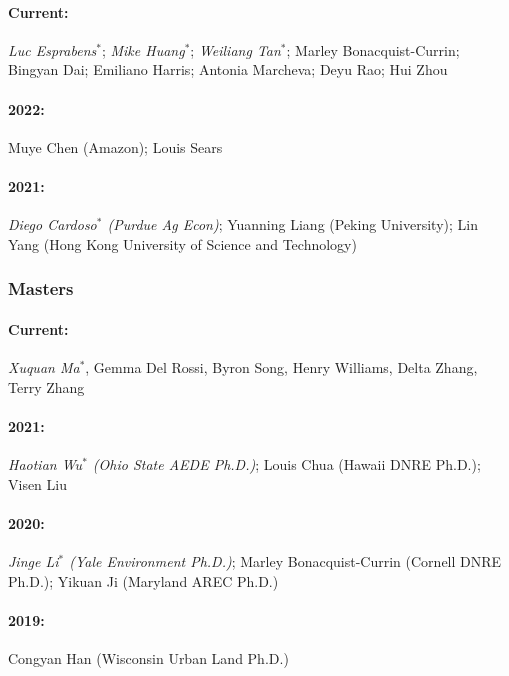 \documentclass[12pt]{res} %
\begin{document}
\begin{resume}
\paragraph{Current:} \textit{Luc Esprabens}$^*$; \textit{Mike Huang}$^*$; \textit{Weiliang Tan}$^*$; Marley Bonacquist-Currin; Bingyan Dai; Emiliano Harris; Antonia Marcheva; Deyu Rao; Hui Zhou
\vspace{-.4in}
\paragraph{2022:} Muye Chen (Amazon); Louis Sears
\vspace{-.4in}
\paragraph{2021:} \textit{Diego Cardoso$^*$ (Purdue Ag Econ)}; Yuanning Liang (Peking University); Lin Yang (Hong Kong University of Science and Technology)

\vspace{-.2in}

\subsubsection{Masters}\vspace{-.2in}
\paragraph{Current:} \textit{Xuquan Ma$^*$}, Gemma Del Rossi, Byron Song, Henry Williams, Delta Zhang, Terry Zhang
\vspace{-.4in}
\paragraph{2021:} \textit{Haotian Wu$^*$ (Ohio State AEDE Ph.D.)}; Louis Chua (Hawaii DNRE Ph.D.); Visen Liu
\vspace{-.4in}
\paragraph{2020:} \textit{Jinge Li$^*$ (Yale Environment Ph.D.)}; Marley Bonacquist-Currin (Cornell DNRE Ph.D.); Yikuan Ji (Maryland AREC Ph.D.)
\vspace{-.4in}
\paragraph{2019:} Congyan Han (Wisconsin Urban Land Ph.D.)


\end{resume}
\end{document}
